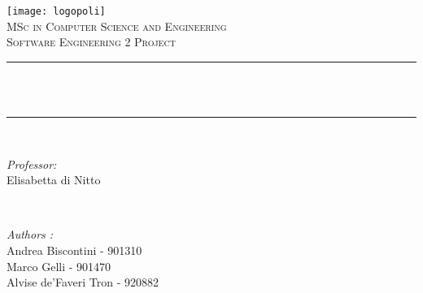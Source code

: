 \begin{titlepage}
	\centering
	\vspace*{0.5 cm}
	\texttt{[image: logopoli]}\\[1.0 cm]	%
	\textsc{\LARGE MSc in Computer Science and Engineering}\\[2.0 cm]	%
	\textsc{\Large Software Engineering 2 Project}\\[0.5 cm]				%
	\rule{\linewidth}{0.2 mm} \\[0.4 cm]
	{ \huge \bfseries \thetitle}\\
	\rule{\linewidth}{0.2 mm} \\[1.5 cm]
	
	\begin{minipage}{0.4\textwidth}
		\begin{flushleft} \large
			\emph{Professor:}\\
			Elisabetta di Nitto\\
		\end{flushleft}
	\end{minipage}~
	\begin{minipage}{0.6\textwidth}
		
		\begin{flushright} \large
			\emph{Authors :} \\
			Andrea Biscontini - 901310\\
			Marco Gelli - 901470\\
			Alvise de'Faveri Tron - 920882\\
		\end{flushright}
		
	\end{minipage}
		
\end{titlepage}